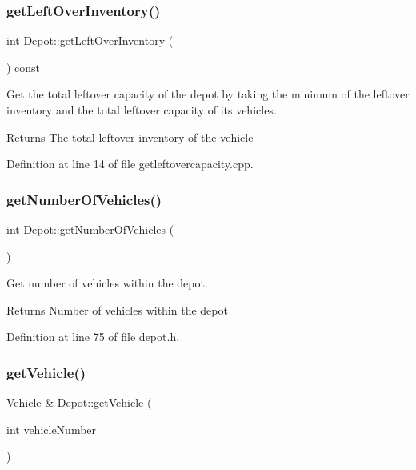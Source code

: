 \subsubsection{\texorpdfstring{get\+Left\+Over\+Inventory()}{getLeftOverInventory()}}
{\footnotesize\ttfamily int Depot\+::get\+Left\+Over\+Inventory (\begin{DoxyParamCaption}{ }\end{DoxyParamCaption}) const}



Get the total leftover capacity of the depot by taking the minimum of the leftover inventory and the total leftover capacity of its vehicles. 

\begin{DoxyReturn}{Returns}
The total leftover inventory of the vehicle 
\end{DoxyReturn}


Definition at line 14 of file getleftovercapacity.\+cpp.

\mbox{\label{class_depot_aa8fa0abff367255b9d908c4e8fb93227}} 
\subsubsection{\texorpdfstring{get\+Number\+Of\+Vehicles()}{getNumberOfVehicles()}}
{\footnotesize\ttfamily int Depot\+::get\+Number\+Of\+Vehicles (\begin{DoxyParamCaption}{ }\end{DoxyParamCaption})\hspace{0.3cm}{\ttfamily [inline]}}

Get number of vehicles within the depot. \begin{DoxyReturn}{Returns}
Number of vehicles within the depot 
\end{DoxyReturn}


Definition at line 75 of file depot.\+h.

\mbox{\label{class_depot_afd012e808f49e162b9713b75fd43c604}} 
\subsubsection{\texorpdfstring{get\+Vehicle()}{getVehicle()}}
{\footnotesize\ttfamily \hyperlink{class_vehicle}{Vehicle} \& Depot\+::get\+Vehicle (\begin{DoxyParamCaption}\item[{int}]{vehicle\+Number }\end{DoxyParamCaption})\hspace{0.3cm}{\ttfamily [inline]}}

